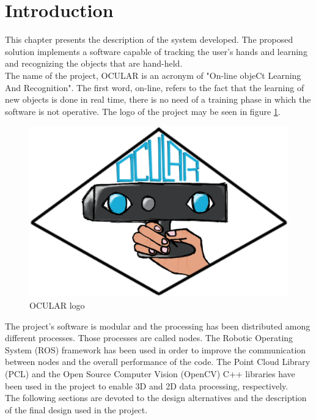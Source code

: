 \section{Introduction}

This chapter presents the description of the system developed.
The proposed solution implements a software capable of tracking the user's hands and learning and recognizing the objects that are hand-held. 
\\

The name of the project, OCULAR is an acronym of "On-line objeCt Learning And Recognition". 
The first word, on-line, refers to the fact that the learning of new objects is done in real time, there is no need of a training phase in which the software is not operative. 
The logo of the project may be seen in figure \ref{ocular_logo}.
\\

\begin{figure}[H]
	\begin{center}
\includegraphics[scale=0.3]{img/ocular_logo.eps}
	\caption[OCULAR Logo]{OCULAR logo}
	\end{center}
	\label{ocular_logo}
\end{figure}

The project's software is modular and the processing has been distributed among different processes.
Those processes are called nodes.  
The Robotic Operating System (ROS) framework has been used in order to improve the communication between nodes and the overall performance of the code. The Point Cloud Library (PCL) and 
the Open Source Computer Vision (OpenCV) C++ libraries have been used in the project to enable 3D and 2D data processing, respectively. 
\\
The following sections are devoted to the design alternatives and the description of the final design used in the project. 